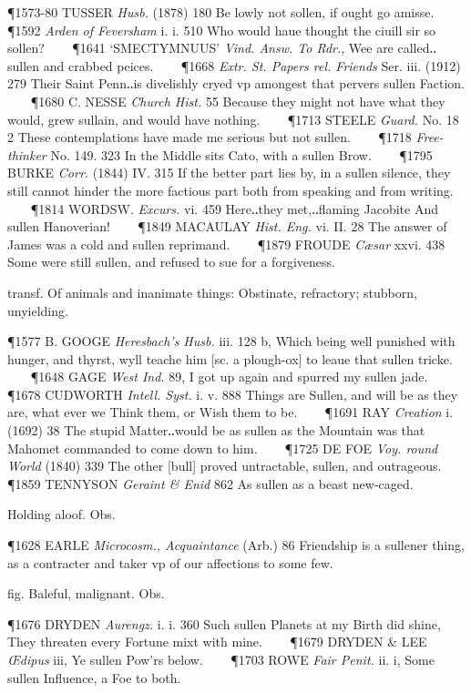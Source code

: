 \begin{description}[wide, labelwidth=!, labelindent=0pt]
\begin{myenumerate}
\P 1573-80 TUSSER  \textit{Husb.} (1878) 180 Be lowly not sollen, if ought go amisse.    
\P 1592 \textit{Arden  of Feversham} i. i. 510 Who would haue thought the ciuill sir so sollen?    
\P 1641 ‘SMECTYMNUUS’  \textit{Vind. Answ. To Rdr.}, Wee are called‥sullen and crabbed peices.    
\P 1668  \textit{Extr. St. Papers rel. Friends} Ser. iii. (1912) 279 Their Saint Penn‥is divelishly cryed vp amongest that pervers sullen Faction.    
\P 1680 C. NESSE  \textit{Church Hist.} 55 Because they might not have what they would, grew sullain, and would have nothing.    
\P 1713 STEELE  \textit{Guard.} No. 18 2 These contemplations have made me serious but not sullen.    
\P 1718  \textit{Free-thinker} No. 149. 323 In the Middle sits Cato, with a sullen Brow.    
\P 1795 BURKE  \textit{Corr.} (1844) IV. 315 If the better part lies by, in a sullen silence, they still cannot hinder the more factious part both from speaking and from writing.    
\P 1814 WORDSW.  \textit{Excurs.} vi. 459 Here‥they met,‥flaming Jacobite And sullen Hanoverian!    
\P 1849 MACAULAY  \textit{Hist. Eng.} vi. II. 28 The answer of James was a cold and sullen reprimand.    
\P 1879 FROUDE  \textit{Cæsar} xxvi. 438 Some were still sullen, and refused to sue for a forgiveness.

 transf. Of animals and inanimate things: Obstinate, refractory; stubborn, unyielding.

\P 1577 B. GOOGE  \textit{Heresbach's Husb.} iii. 128 b, Which being well punished with hunger, and thyrst, wyll teache him [sc. a plough-ox] to leaue that sullen tricke.    
\P 1648 GAGE  \textit{West Ind.} 89, I got up again and spurred my sullen jade.    
\P 1678 CUDWORTH  \textit{Intell. Syst.} i. v. 888 Things are Sullen, and will be as they are, what ever we Think them, or Wish them to be.    
\P 1691 RAY  \textit{Creation} i. (1692) 38 The stupid Matter‥would be as sullen as the Mountain was that Mahomet commanded to come down to him.    
\P 1725 DE FOE  \textit{Voy. round World} (1840) 339 The other [bull] proved untractable, sullen, and outrageous.    
\P 1859 TENNYSON  \textit{Geraint \& Enid} 862 As sullen as a beast new-caged.

 Holding aloof. Obs.

\P 1628 EARLE  \textit{Microcosm., Acquaintance} (Arb.) 86 Friendship is a sullener thing, as a contracter and taker vp of our affections to some few.

 fig. Baleful, malignant. Obs.

\P 1676 DRYDEN  \textit{Aurengz.} i. i. 360 Such sullen Planets at my Birth did shine, They threaten every Fortune mixt with mine.    
\P 1679 DRYDEN \& LEE  \textit{Œdipus} iii, Ye sullen Pow'rs below.    
\P 1703 ROWE  \textit{Fair Penit.} ii. i, Some sullen Influence, a Foe to both.


\end{myenumerate}
\end{description}
